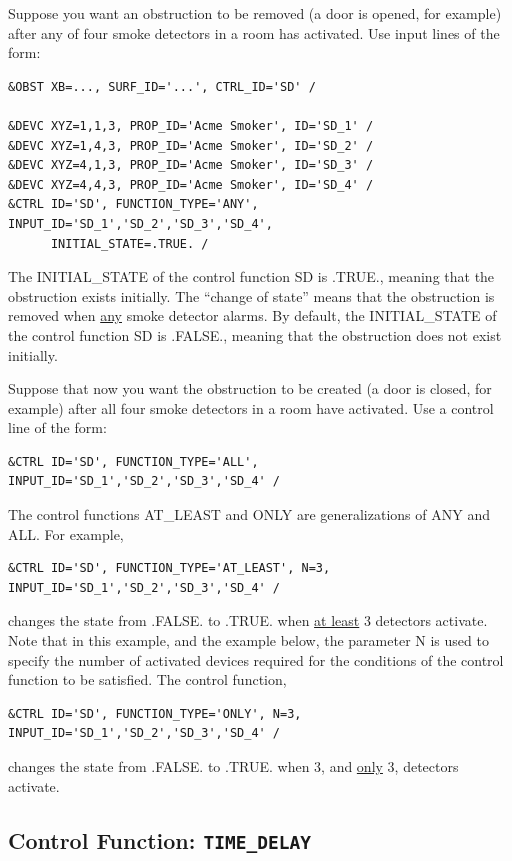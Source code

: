 \documentclass[11pt]{book}
\begin{document}
Suppose you want an obstruction to be removed (a door is opened, for example) after any of four smoke detectors in a room has activated. Use input lines of the form:
\begin{lstlisting}
&OBST XB=..., SURF_ID='...', CTRL_ID='SD' /

&DEVC XYZ=1,1,3, PROP_ID='Acme Smoker', ID='SD_1' /
&DEVC XYZ=1,4,3, PROP_ID='Acme Smoker', ID='SD_2' /
&DEVC XYZ=4,1,3, PROP_ID='Acme Smoker', ID='SD_3' /
&DEVC XYZ=4,4,3, PROP_ID='Acme Smoker', ID='SD_4' /
&CTRL ID='SD', FUNCTION_TYPE='ANY', INPUT_ID='SD_1','SD_2','SD_3','SD_4',
      INITIAL_STATE=.TRUE. /
\end{lstlisting}
The {\ct INITIAL\_STATE} of the control function {\ct SD} is {\ct .TRUE.}, meaning that the obstruction exists initially. The ``change of state'' means that the obstruction is removed when \underline{any} smoke detector alarms.  By default, the {\ct INITIAL\_STATE} of the control function {\ct SD} is {\ct .FALSE.}, meaning that the obstruction does not exist initially.

Suppose that now you want the obstruction to be created (a door is closed, for example) after all four smoke detectors in a room have activated. Use a control line of the form:
\begin{lstlisting}
&CTRL ID='SD', FUNCTION_TYPE='ALL', INPUT_ID='SD_1','SD_2','SD_3','SD_4' /
\end{lstlisting}
The control functions {\ct AT\_LEAST} and {\ct ONLY} are generalizations of {\ct ANY} and {\ct ALL}. For example,
\begin{lstlisting}
&CTRL ID='SD', FUNCTION_TYPE='AT_LEAST', N=3, INPUT_ID='SD_1','SD_2','SD_3','SD_4' /
\end{lstlisting}
changes the state from {\ct .FALSE.} to {\ct .TRUE.} when \underline{at least} 3 detectors activate. Note that in this example, and the example below, the parameter {\ct N} is used to specify the number of activated devices required for the conditions of the control function to be satisfied. The control function,
\begin{lstlisting}
&CTRL ID='SD', FUNCTION_TYPE='ONLY', N=3, INPUT_ID='SD_1','SD_2','SD_3','SD_4' /
\end{lstlisting}
changes the state from {\ct .FALSE.} to {\ct .TRUE.} when 3, and \underline{only} 3, detectors activate.


\subsection{Control Function: \texorpdfstring{{\tt TIME\_DELAY}}{TIME\_DELAY}}
\end{document}
